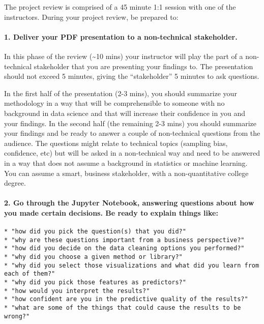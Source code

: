 \documentclass[11pt]{article}
\begin{document}
The project review is comprised of a 45 minute 1:1 session with one of
the instructors. During your project review, be prepared to:

\hypertarget{deliver-your-pdf-presentation-to-a-non-technical-stakeholder.}{%
\paragraph{1. Deliver your PDF presentation to a non-technical
stakeholder.}\label{deliver-your-pdf-presentation-to-a-non-technical-stakeholder.}}

In this phase of the review (\textasciitilde{}10 mins) your instructor
will play the part of a non-technical stakeholder that you are
presenting your findings to. The presentation should not exceed 5
minutes, giving the ``stakeholder'' 5 minutes to ask questions.

In the first half of the presentation (2-3 mins), you should summarize
your methodology in a way that will be comprehensible to someone with no
background in data science and that will increase their confidence in
you and your findings. In the second half (the remaining 2-3 mins) you
should summarize your findings and be ready to answer a couple of
non-technical questions from the audience. The questions might relate to
technical topics (sampling bias, confidence, etc) but will be asked in a
non-technical way and need to be answered in a way that does not assume
a background in statistics or machine learning. You can assume a smart,
business stakeholder, with a non-quantitative college degree.

\hypertarget{go-through-the-jupyter-notebook-answering-questions-about-how-you-made-certain-decisions.-be-ready-to-explain-things-like}{%
\paragraph{2. Go through the Jupyter Notebook, answering questions about
how you made certain decisions. Be ready to explain things
like:}\label{go-through-the-jupyter-notebook-answering-questions-about-how-you-made-certain-decisions.-be-ready-to-explain-things-like}}

\begin{verbatim}
* "how did you pick the question(s) that you did?"
* "why are these questions important from a business perspective?"
* "how did you decide on the data cleaning options you performed?"
* "why did you choose a given method or library?"
* "why did you select those visualizations and what did you learn from each of them?"
* "why did you pick those features as predictors?"
* "how would you interpret the results?"
* "how confident are you in the predictive quality of the results?"
* "what are some of the things that could cause the results to be wrong?"
\end{verbatim}
\end{document}
